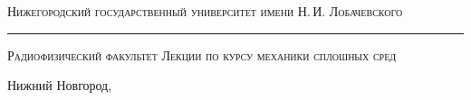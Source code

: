 \begin{titlepage}

\begin{center}

	\textsc{Нижегородский государственный университет имени Н.\,И. Лобачевского}
	\vskip 4pt \hrule \vskip 8pt
	\textsc{Радиофизический факультет}
	\vskip 60pt
	\Large{\textsc{Лекции по курсу механики сплошных сред}}
	\vfill


\end{center}

\vfill

\begin{flushright}
	{\sciadviser}
\end{flushright}

\vfill

\begin{center}
	Нижний Новгород, \the\year
\end{center}

\end{titlepage}